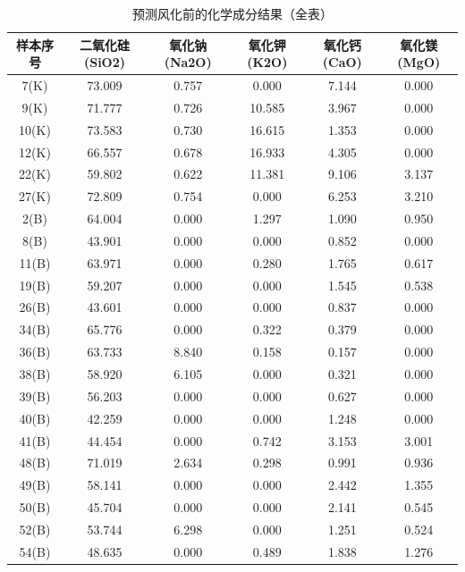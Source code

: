 \documentclass{my_paper}
\begin{document}
\begin{enumerate}
  \begin{longtable}{c|ccccc}
    \caption{预测风化前的化学成分结果（全表）}
    \label{jieguo2}\\\toprule
    样本序号                 & \multicolumn{1}{c}{\textbf{二氧化硅(SiO2)}}  & \multicolumn{1}{c}{\textbf{氧化钠(Na2O)}}  & \multicolumn{1}{c}{\textbf{氧化钾(K2O)}}  & \multicolumn{1}{c}{\textbf{氧化钙(CaO)}}  & \multicolumn{1}{c}{\textbf{氧化镁(MgO)}} \\\midrule
    7(K)    & 73.009 & 0.757 & 0.000  & 7.144  & 0.000  \\
    9(K)    & 71.777 & 0.726 & 10.585 & 3.967  & 0.000  \\
    10(K)   & 73.583 & 0.730 & 16.615 & 1.353  & 0.000  \\
    12(K)   & 66.557 & 0.678 & 16.933 & 4.305  & 0.000  \\
    22(K)   & 59.802 & 0.622 & 11.381 & 9.106  & 3.137  \\
    27(K)   & 72.809 & 0.754 & 0.000  & 6.253  & 3.210  \\
    2(B)    & 64.004 & 0.000 & 1.297  & 1.090  & 0.950  \\
    8(B)    & 43.901 & 0.000 & 0.000  & 0.852  & 0.000  \\
    11(B)   & 63.971 & 0.000 & 0.280  & 1.765  & 0.617  \\
    19(B)   & 59.207 & 0.000 & 0.000  & 1.545  & 0.538  \\
    26(B)   & 43.601 & 0.000 & 0.000  & 0.837  & 0.000  \\
    34(B)   & 65.776 & 0.000 & 0.322  & 0.379  & 0.000  \\
    36(B)   & 63.733 & 8.840 & 0.158  & 0.157  & 0.000  \\
    38(B)   & 58.920 & 6.105 & 0.000  & 0.321  & 0.000  \\
    39(B)   & 56.203 & 0.000 & 0.000  & 0.627  & 0.000  \\
    40(B)   & 42.259 & 0.000 & 0.000  & 1.248  & 0.000  \\
    41(B)   & 44.454 & 0.000 & 0.742  & 3.153  & 3.001  \\
    48(B)   & 71.019 & 2.634 & 0.298  & 0.991  & 0.936  \\
    49(B)   & 58.141 & 0.000 & 0.000  & 2.442  & 1.355  \\
    50(B)   & 45.704 & 0.000 & 0.000  & 2.141  & 0.545  \\
    52(B)   & 53.744 & 6.298 & 0.000  & 1.251  & 0.524  \\
    54(B)   & 48.635 & 0.000 & 0.489  & 1.838  & 1.276  \\

\end{longtable}
\end{enumerate}
\end{document}
